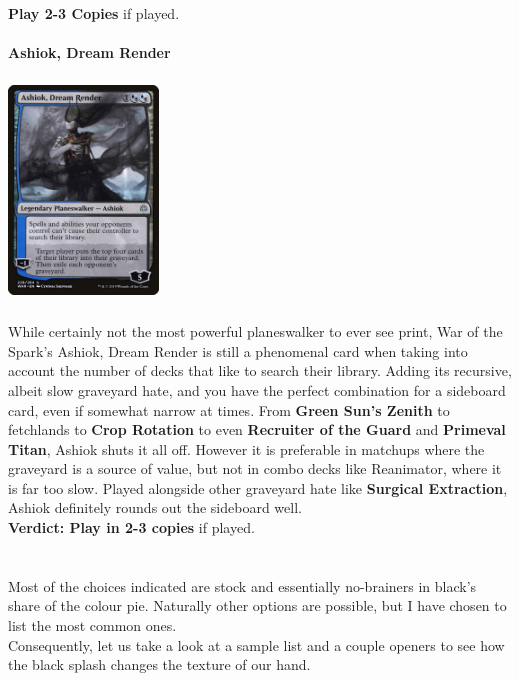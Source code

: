 \documentclass{report}
\begin{document}
\textbf{Play 2-3 Copies} if played.\\\\
\textbf{Ashiok, Dream Render\\}
\begin{center}
\includegraphics [width = 4cm, height = 6cm] {ashiok-dream-render}
\end{center}
While certainly not the most powerful planeswalker to ever see print, War of the Spark's Ashiok, Dream Render is still a phenomenal card when taking into account the number of decks that like to search their library. Adding its recursive, albeit slow graveyard hate, and you have the perfect combination for a sideboard card, even if somewhat narrow at times. From \textbf{Green Sun's Zenith} to fetchlands to \textbf{Crop Rotation} to even \textbf{Recruiter of the Guard} and \textbf{Primeval Titan}, Ashiok shuts it all off. However it is preferable in matchups where the graveyard is a source of value, but not in combo decks like Reanimator, where it is far too slow. Played alongside other graveyard hate like \textbf{Surgical Extraction}, Ashiok definitely rounds out the sideboard well.\\
\textbf{Verdict: Play in 2-3 copies} if played.\\\\\\
Most of the choices indicated are stock and essentially no-brainers in black's share of the colour pie. Naturally other options are possible, but I have chosen to list the most common ones.\\
Consequently, let us take a look at a sample list and a couple openers to see how the black splash changes the texture of our hand.\\
\end{document}
